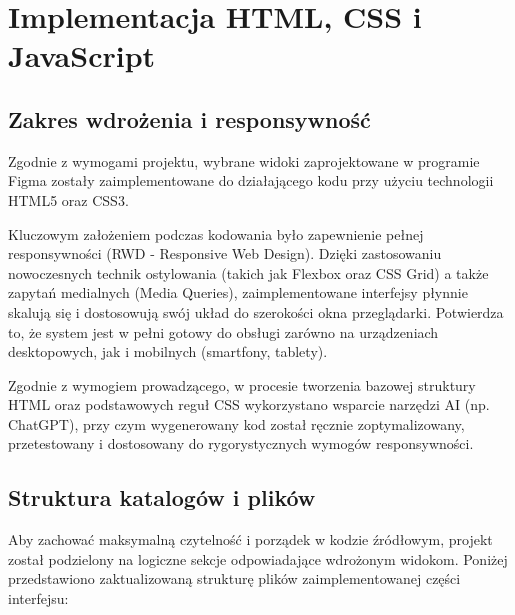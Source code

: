 \chapter{Implementacja HTML, CSS i JavaScript}

\section{Zakres wdrożenia i responsywność}
Zgodnie z wymogami projektu, wybrane widoki zaprojektowane w programie Figma zostały zaimplementowane do działającego kodu przy użyciu technologii HTML5 oraz CSS3. 

Kluczowym założeniem podczas kodowania było zapewnienie pełnej responsywności (RWD - Responsive Web Design). Dzięki zastosowaniu nowoczesnych technik ostylowania (takich jak Flexbox oraz CSS Grid) a także zapytań medialnych (Media Queries), zaimplementowane interfejsy płynnie skalują się i dostosowują swój układ do szerokości okna przeglądarki. Potwierdza to, że system jest w pełni gotowy do obsługi zarówno na urządzeniach desktopowych, jak i mobilnych (smartfony, tablety).

Zgodnie z wymogiem prowadzącego, w procesie tworzenia bazowej struktury HTML oraz podstawowych reguł CSS wykorzystano wsparcie narzędzi AI (np. ChatGPT), przy czym wygenerowany kod został ręcznie zoptymalizowany, przetestowany i dostosowany do rygorystycznych wymogów responsywności.

\section{Struktura katalogów i plików}
Aby zachować maksymalną czytelność i porządek w kodzie źródłowym, projekt został podzielony na logiczne sekcje odpowiadające wdrożonym widokom. Poniżej przedstawiono zaktualizowaną strukturę plików zaimplementowanej części interfejsu:

